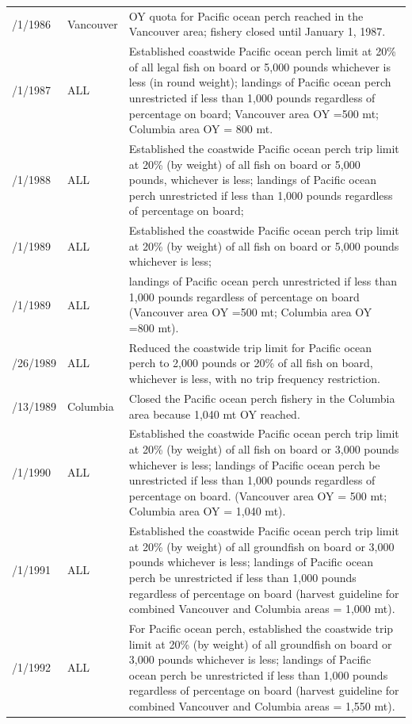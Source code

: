 \documentclass[12pt,]{article}
\begin{document}
\begin{table}[ht]
\begin{tabular}{>{\centering}p{.60in}>{\centering}p{1.0in}>{\raggedright}p{4.20in}}
  12/1/1986 &  Vancouver  &  OY quota for Pacific ocean perch reached in the Vancouver area; fishery closed until January 1, 1987.  \\ 
  1/1/1987 &  ALL  &  Established coastwide Pacific ocean perch limit at 20\% of all legal fish on board or 5,000 pounds whichever is less (in round weight); landings of Pacific ocean perch unrestricted if less than 1,000 pounds regardless of percentage on board; Vancouver area OY =500 mt; Columbia area OY = 800 mt.  \\ 
  1/1/1988 &  ALL  &  Established the coastwide Pacific ocean perch trip limit at 20\% (by weight) of all fish on board or 5,000 pounds, whichever is less; landings of Pacific ocean perch unrestricted if less than 1,000 pounds regardless of percentage on board;  \\ 
  1/1/1989 &  ALL  &  Established the coastwide Pacific ocean perch trip limit at 20\% (by weight) of all fish on board or 5,000 pounds whichever is less;  \\ 
  1/1/1989 &  ALL  &  landings of Pacific ocean perch unrestricted if less than 1,000 pounds regardless of percentage on board (Vancouver area OY =500 mt; Columbia area OY =800 mt).  \\ 
  7/26/1989 &  ALL  &  Reduced the coastwide trip limit for Pacific ocean perch to 2,000 pounds or 20\% of all fish on board, whichever is less, with no trip frequency restriction.  \\ 
  12/13/1989 &  Columbia  &   Closed the Pacific ocean perch fishery in the Columbia area because 1,040 mt OY reached.  \\ 
  1/1/1990 &  ALL  &  Established the coastwide Pacific ocean perch trip limit at 20\% (by weight) of all fish on board or 3,000 pounds whichever is less; landings of Pacific ocean perch be unrestricted if less than 1,000 pounds regardless of percentage on board.  (Vancouver area OY = 500 mt; Columbia area OY = 1,040 mt). \\ 
  1/1/1991 &  ALL  &  Established the coastwide Pacific ocean perch trip limit at 20\% (by weight) of all groundfish on board or 3,000 pounds whichever is less; landings of Pacific ocean perch be unrestricted if less than 1,000 pounds regardless of percentage on board (harvest guideline for combined Vancouver and Columbia areas = 1,000 mt). \\ 
  1/1/1992 &  ALL  &  For Pacific ocean perch, established the coastwide trip limit at 20\% (by weight) of all groundfish on board or 3,000 pounds whichever is less; landings of Pacific ocean perch be unrestricted if less than 1,000 pounds regardless of percentage on board (harvest guideline for combined Vancouver and Columbia areas = 1,550 mt). \\ 

\end{tabular}
\end{table}
\end{document}
